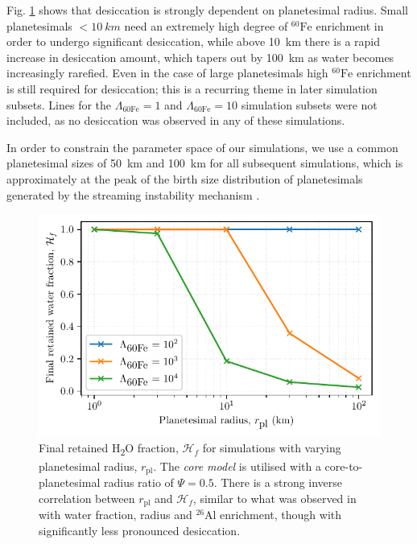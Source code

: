\documentclass[fleqn,usenatbib]{mnras}
\newcommand{\rms}[1]{\ensuremath{_{\text{#1}}}}
\newcommand{\tsu}[1]{\textsubscript{#1}}
\newcommand{\atom}[2]{$^{#2}\text{#1}$}
\newcommand{\al}{\atom{Al}{26}}
\newcommand{\fe}{\atom{Fe}{60}}
\newcommand{\water}{{H\tsu{2}O}}
\newcommand{\waterfracHf}{\mathcal{H}_f}
\begin{document}
Fig. \ref{fig:radius-comparison} shows that desiccation is strongly dependent on planetesimal radius.
Small planetesimals $<\SI{10}{km}$ need an extremely high degree of \fe{} enrichment in order to undergo significant desiccation, while above \SI{10}{km} there is a rapid increase in desiccation amount, which tapers out by \SI{100}{km} as water becomes increasingly rarefied.
Even in the case of large planetesimals high \fe{} enrichment is still required for desiccation; this is a recurring theme in later simulation subsets.
Lines for the $\Lambda\rms{60Fe} = 1$ and $\Lambda\rms{60Fe} = 10$ simulation subsets were not included, as no desiccation was observed in any of these simulations.

In order to constrain the parameter space of our simulations, we use a common planetesimal sizes of \SI{50}{km} and \SI{100}{km} for all subsequent simulations, which is approximately at the peak of the birth size distribution of planetesimals generated by the streaming instability mechanism \citep{2019ApJ...885...69L,2022arXiv221204509S}.

\begin{figure}
  \centering
  \includegraphics[scale=0.7]{assets/radius-comparison.pdf}
  \caption{Final retained \water{} fraction, $\waterfracHf$ for simulations with varying planetesimal radius, $r\rms{pl}$. The \emph{core model} is utilised with a core-to-planetesimal radius ratio of $\Psi = 0.5$. There is a strong inverse correlation between $r\rms{pl}$ and $\waterfracHf$, similar to what was observed in \citet{lichtenbergWaterBudgetDichotomy2019} with water fraction, radius and \al{} enrichment, though with significantly less pronounced desiccation.}
  \label{fig:radius-comparison}
\end{figure}
\end{document}
